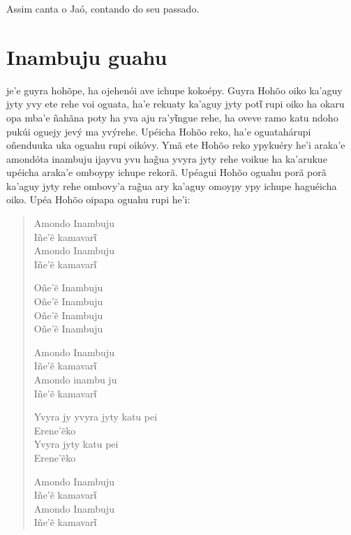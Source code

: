 Assim canta o Jaó, contando do seu passado.



\chapter{Inambuju guahu}

 je'e guyra hohõpe, ha ojehenói ave ichupe kokoépy. Guyra Hohõo
oiko ka'aguy jyty yvy ete rehe voi oguata, ha'e rekuaty ka'aguy jyty
potῖ rupi oiko ha okaru opa mba'e ñahãna poty ha yva aju ra'yῖngue rehe,
ha oveve ramo katu ndoho pukúi oguejy jevý ma yvýrehe. Upéicha Hohõo
reko, ha'e oguatahárupi oñenduuka uka oguahu rupi oikóvy. Ymã ete Hohõo
reko ypykuéry he'i araka'e amondóta inambuju ijayvu yvu hag̃ua yvyra jyty
rehe voikue ha ka'arukue upéicha araka'e omboypy ichupe rekorã. Upéagui
Hohõo oguahu porã porã ka'aguy jyty rehe ombovy'a rag̃ua ary ka'aguy
omoypy ypy ichupe haguéicha oiko. Upéa Hohõo oipapa oguahu rupi he'i:

\begin{verse}
Amondo Inambuju\\
Iñe'ẽ kamavarῖ\\
Amondo Inambuju\\
Iñe'ẽ kamavarῖ

Oñe'ẽ Inambuju\\
Oñe'ẽ Inambuju\\
Oñe'ẽ Inambuju\\
Oñe'ẽ Inambuju

Amondo Inambuju\\
Iñe'ẽ kamavarῖ\\
Amondo inambu ju\\
Iñe'ẽ kamavarῖ

\pagebreak
Yvyra jy yvyra jyty katu pei\\
Erene'ẽko\\
Yvyra jyty katu pei\\
Erene'ẽko

Amondo Inambuju\\
Iñe'ẽ kamavarῖ\\
Amondo Inambuju\\
Iñe'ẽ kamavarῖ
\end{verse}

